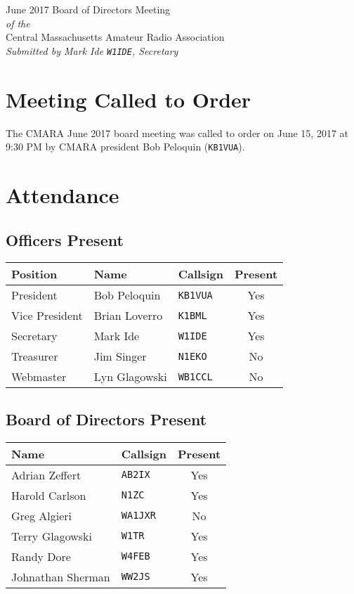 \documentclass[10pt,letterpaper]{article}
\begin{document}
\begin{center}
{\huge June 2017 Board of Directors Meeting}\\
\emph{of the}\\
{\Large Central Massachusetts Amateur Radio Association}\\
\emph{Submitted by Mark Ide \texttt{W1IDE}, Secretary}
\end{center}

\section{Meeting Called to Order}
The CMARA June 2017 board meeting was called to order on June 15, 2017 at 9:30 PM by CMARA president Bob Peloquin (\texttt{KB1VUA}).

\section{Attendance}

\subsection{Officers Present}
\begin{tabular}{|l|l|l|c|}
  \hline
  \textbf{Position} & \textbf{Name}  & \textbf{Callsign} & \textbf{Present} \\ \hline
  President         & Bob Peloquin   & \texttt{KB1VUA}   & Yes \\
  Vice President    & Brian Loverro  & \texttt{K1BML}    & Yes \\
  Secretary         & Mark Ide       & \texttt{W1IDE}    & Yes \\
  Treasurer         & Jim Singer     & \texttt{N1EKO}    & No \\
  Webmaster         & Lyn Glagowski  & \texttt{WB1CCL}   & No \\
  \hline
\end{tabular}

\subsection{Board of Directors Present}
\begin{tabular}{|l|l|c|}
  \hline
  \textbf{Name}     & \textbf{Callsign} & \textbf{Present} \\ \hline
  Adrian Zeffert    & \texttt{AB2IX}    & Yes \\
  Harold Carlson    & \texttt{N1ZC}     & Yes \\
  Greg Algieri      & \texttt{WA1JXR}   & No \\
  Terry Glagowski   & \texttt{W1TR}     & Yes \\
  Randy Dore        & \texttt{W4FEB}    & Yes \\
  Johnathan Sherman & \texttt{WW2JS}    & Yes \\
  \hline
\end{tabular}
\end{document}
